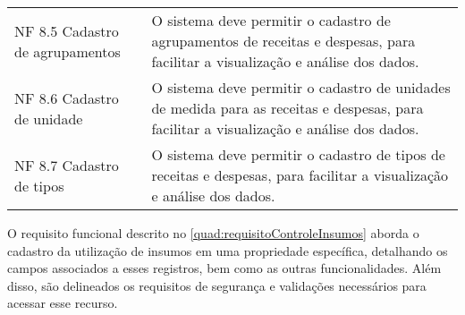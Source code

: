 \begin{tabframed}[htb]
\begin{tabular}{|l|l|}
    NF 8.5 Cadastro de agrupamentos &
    \multicolumn{1}{|p{8cm}|}{\raggedright
    O sistema deve permitir o cadastro de agrupamentos de receitas e despesas, para facilitar a visualização e análise dos dados.}
    \\ \cline{1-2}

    NF 8.6 Cadastro de unidade      &
    \multicolumn{1}{|p{8cm}|}{\raggedright
    O sistema deve permitir o cadastro de unidades de medida para as receitas e despesas, para facilitar a visualização e análise dos dados.}
    \\ \cline{1-2}

    NF 8.7 Cadastro de tipos        &
    \multicolumn{1}{|p{8cm}|}{\raggedright
    O sistema deve permitir o cadastro de tipos de receitas e despesas, para facilitar a visualização e análise dos dados.}
    \\ \cline{1-2}
  \end{tabular}
  \fonte{} %
\end{tabframed}

O requisito funcional descrito no \autoref{quad:requisitoControleInsumos}  aborda o cadastro da utilização de insumos em uma propriedade específica, detalhando os campos associados a esses registros, bem como as outras funcionalidades. Além disso, são delineados os requisitos de segurança e validações necessários para acessar esse recurso.


